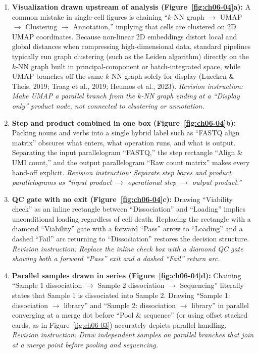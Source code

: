 \begin{enumerate}
\item \textbf{Visualization drawn upstream of analysis (Figure~\ref{fig:ch06-04}a):} A common mistake in single-cell figures is chaining ``$k$-NN graph $\rightarrow$ UMAP $\rightarrow$ Clustering $\rightarrow$ Annotation,'' implying that cells are clustered on 2D UMAP coordinates. Because non-linear 2D embeddings distort local and global distances when compressing high-dimensional data, standard pipelines typically run graph clustering (such as the Leiden algorithm) directly on the $k$-NN graph built in principal-component or batch-integrated space, while UMAP branches off the same $k$-NN graph solely for display (Luecken \& Theis, 2019; Traag et al., 2019; Heumos et al., 2023). \emph{Revision instruction: Make UMAP a parallel branch from the $k$-NN graph ending at a ``Display only'' product node, not connected to clustering or annotation.}
\item \textbf{Step and product combined in one box (Figure~\ref{fig:ch06-04}b):} Packing nouns and verbs into a single hybrid label such as ``FASTQ align matrix'' obscures what enters, what operation runs, and what is output. Separating the input parallelogram ``FASTQ,'' the step rectangle ``Align \& UMI count,'' and the output parallelogram ``Raw count matrix'' makes every hand-off explicit. \emph{Revision instruction: Separate step boxes and product parallelograms as ``input product $\rightarrow$ operational step $\rightarrow$ output product.''}
\item \textbf{QC gate with no exit (Figure~\ref{fig:ch06-04}c):} Drawing ``Viability check'' as an inline rectangle between ``Dissociation'' and ``Loading'' implies unconditional loading regardless of cell death. Replacing the rectangle with a diamond ``Viability'' gate with a forward ``Pass'' arrow to ``Loading'' and a dashed ``Fail'' arc returning to ``Dissociation'' restores the decision structure. \emph{Revision instruction: Replace the inline check box with a diamond QC gate showing both a forward ``Pass'' exit and a dashed ``Fail'' return arc.}
\item \textbf{Parallel samples drawn in series (Figure~\ref{fig:ch06-04}d):} Chaining ``Sample 1 dissociation $\rightarrow$ Sample 2 dissociation $\rightarrow$ Sequencing'' literally states that Sample 1 is dissociated into Sample 2. Drawing ``Sample 1: dissociation $\rightarrow$ library'' and ``Sample 2: dissociation $\rightarrow$ library'' in parallel converging at a merge dot before ``Pool \& sequence'' (or using offset stacked cards, as in Figure~\ref{fig:ch06-03}) accurately depicts parallel handling. \emph{Revision instruction: Draw independent samples on parallel branches that join at a merge point before pooling and sequencing.}
\end{enumerate}

